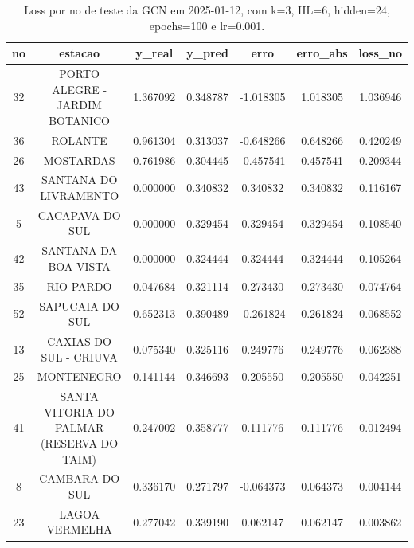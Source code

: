 \begin{table}[h]
\centering
\caption{Loss por no de teste da GCN em 2025-01-12, com k=3, HL=6, hidden=24, epochs=100 e lr=0.001.}
\label{tab:gcn_loss_k3_hl6_h24_e100_d20250112}
\begin{tabular}{ccccccc}
\toprule
no & estacao & y\_real & y\_pred & erro & erro\_abs & loss\_no \\
\midrule
32 & PORTO ALEGRE - JARDIM BOTANICO & 1.367092 & 0.348787 & -1.018305 & 1.018305 & 1.036946 \\
36 & ROLANTE & 0.961304 & 0.313037 & -0.648266 & 0.648266 & 0.420249 \\
26 & MOSTARDAS & 0.761986 & 0.304445 & -0.457541 & 0.457541 & 0.209344 \\
43 & SANTANA DO LIVRAMENTO & 0.000000 & 0.340832 & 0.340832 & 0.340832 & 0.116167 \\
5 & CACAPAVA DO SUL & 0.000000 & 0.329454 & 0.329454 & 0.329454 & 0.108540 \\
42 & SANTANA DA BOA VISTA & 0.000000 & 0.324444 & 0.324444 & 0.324444 & 0.105264 \\
35 & RIO PARDO & 0.047684 & 0.321114 & 0.273430 & 0.273430 & 0.074764 \\
52 & SAPUCAIA DO SUL & 0.652313 & 0.390489 & -0.261824 & 0.261824 & 0.068552 \\
13 & CAXIAS DO SUL - CRIUVA & 0.075340 & 0.325116 & 0.249776 & 0.249776 & 0.062388 \\
25 & MONTENEGRO & 0.141144 & 0.346693 & 0.205550 & 0.205550 & 0.042251 \\
41 & SANTA VITORIA DO PALMAR (RESERVA DO TAIM) & 0.247002 & 0.358777 & 0.111776 & 0.111776 & 0.012494 \\
8 & CAMBARA DO SUL & 0.336170 & 0.271797 & -0.064373 & 0.064373 & 0.004144 \\
23 & LAGOA VERMELHA & 0.277042 & 0.339190 & 0.062147 & 0.062147 & 0.003862 \\
\bottomrule
\end{tabular}
\end{table}
